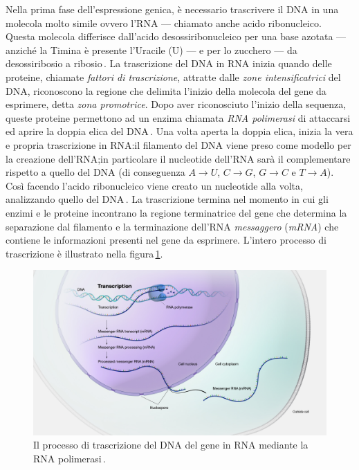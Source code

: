 Nella prima fase dell'espressione genica, è necessario trascrivere il DNA in una molecola molto simile ovvero l'RNA — chiamato anche acido ribonucleico. Questa molecola differisce dall'acido desossiribonucleico per una base azotata — anziché la Timina è presente l'Uracile (U) — e per lo zucchero — da desossiribosio a ribosio\,\cite{alberts2002dna}. La trascrizione del DNA in RNA inizia quando delle proteine, chiamate \textsl{fattori di trascrizione}, attratte dalle \textsl{zone intensificatrici} del DNA, riconoscono la regione che delimita l'inizio della molecola del gene da esprimere, detta \textsl{zona promotrice}. Dopo aver riconosciuto l'inizio della sequenza, queste proteine permettono ad un enzima chiamata \textsl{RNA polimerasi} di attaccarsi ed aprire la doppia elica del DNA\,\cite{cramer2019organization}. Una volta aperta la doppia elica, inizia la vera e propria trascrizione in RNA:\@ il filamento del DNA viene preso come modello per la creazione dell'RNA;\@ in particolare il nucleotide dell'RNA sarà il complementare rispetto a quello del DNA (di conseguenza $A\rightarrow U$, $C\rightarrow G$, $G\rightarrow C$ e $T\rightarrow A$). Così facendo l'acido ribonucleico viene creato un nucleotide alla volta, analizzando quello del DNA\,\cite{alberts2002dna}. La trascrizione termina nel momento in cui gli enzimi e le proteine incontrano la regione terminatrice del gene che determina la separazione dal filamento e la terminazione dell'RNA \textsl{messaggero} (\textsl{mRNA}) che contiene le informazioni presenti nel gene da esprimere. L'intero processo di trascrizione è illustrato nella figura\,\ref{fig:dna-transcription}.

\begin{figure}[b!]
    \centering
    \includegraphics[width=\textwidth]{assets/dna-transcription.jpg}
    \caption[Il processo di trascrizione del DNA in RNA.]{Il processo di trascrizione del DNA del gene in RNA mediante la RNA polimerasi\,\cite{nhgri_transcription_image}.}\label{fig:dna-transcription}
\end{figure}

